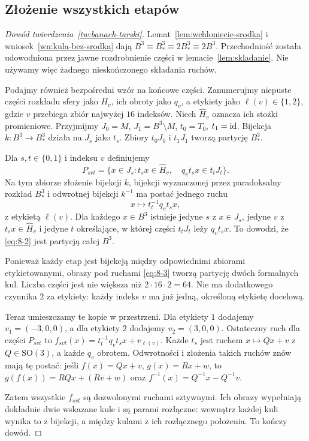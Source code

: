\subsection{Złożenie wszystkich etapów}
\begin{proof}[Dowód twierdzenia~\ref{tw:banach-tarski}]
Lemat~\ref{lem:wchloniecie-srodka} i wniosek~\ref{wn:kula-bez-srodka} dają $B^3\equiv B^3_*\equiv2B^3_*\equiv2B^3$. Przechodniość została udowodniona przez jawne rozdrobnienie części w lemacie~\ref{lem:skladanie}. Nie używamy więc żadnego nieskończonego składania ruchów.

Podajmy również bezpośredni wzór na końcowe części. Zanumerujmy niepuste części rozkładu sfery jako $H_v$, ich obroty jako $q_v$, a etykiety jako $\ell(v)\in\{1,2\}$, gdzie $v$ przebiega zbiór najwyżej $16$ indeksów. Niech $\widehat H_v$ oznacza ich stożki promieniowe. Przyjmijmy $J_0=M$, $J_1=B^3\setminus M$, $t_0=T_0$, $t_1=\mathrm{id}$. Bijekcja $k:B^3\to B^3_*$ działa na $J_s$ jako $t_s$. Zbiory $t_0J_0$ i $t_1J_1$ tworzą partycję $B^3_*$.

Dla $s,t\in\{0,1\}$ i indeksu $v$ definiujemy
\begin{equation}\label{eq:8-2}
 P_{svt}=\{x\in J_s:t_sx\in\widehat H_v,\quad q_vt_sx\in t_tJ_t\}.
\end{equation}
Na tym zbiorze złożenie bijekcji $k$, bijekcji wyznaczonej przez paradoksalny rozkład $B^3_*$ i odwrotnej bijekcji $k^{-1}$ ma postać jednego ruchu
\begin{equation}\label{eq:8-3}
 x\longmapsto t_t^{-1}q_vt_sx,
\end{equation}
z etykietą $\ell(v)$. Dla każdego $x\in B^3$ istnieje jedyne $s$ z $x\in J_s$, jedyne $v$ z $t_sx\in\widehat H_v$ i jedyne $t$ określające, w której części $t_tJ_t$ leży $q_vt_sx$. To dowodzi, że \eqref{eq:8-2} jest partycją całej $B^3$.

Ponieważ każdy etap jest bijekcją między odpowiednimi zbiorami etykietowanymi, obrazy pod ruchami \eqref{eq:8-3} tworzą partycję dwóch formalnych kul. Liczba części jest nie większa niż $2\cdot16\cdot2=64$. Nie ma dodatkowego czynnika $2$ za etykiety: każdy indeks $v$ ma już jedną, określoną etykietę docelową.

Teraz umieszczamy te kopie w przestrzeni. Dla etykiety $1$ dodajemy $v_1=(-3,0,0)$, a dla etykiety $2$ dodajemy $v_2=(3,0,0)$. Ostateczny ruch dla części $P_{svt}$ to $f_{svt}(x)=t_t^{-1}q_vt_sx+v_{\ell(v)}$. Każde $t_s$ jest ruchem $x\mapsto Qx+v$ z $Q\in\mathrm{SO}(3)$, a każde $q_v$ obrotem. Odwrotności i złożenia takich ruchów znów mają tę postać: jeśli $f(x)=Qx+v$, $g(x)=Rx+w$, to $g(f(x))=RQx+(Rv+w)$ oraz $f^{-1}(x)=Q^{-1}x-Q^{-1}v$.

Zatem wszystkie $f_{svt}$ są dozwolonymi ruchami sztywnymi. Ich obrazy wypełniają dokładnie dwie wskazane kule i są parami rozłączne: wewnątrz każdej kuli wynika to z bijekcji, a między kulami z ich rozłącznego położenia. To kończy dowód.
\end{proof}

